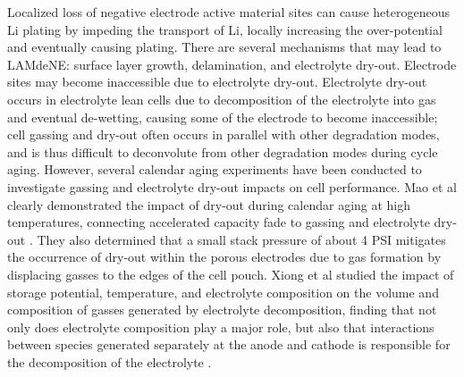 \documentclass{article}
\begin{document}
Localized loss of negative electrode active material sites can cause heterogeneous Li plating by impeding the transport of Li, locally increasing the over-potential and eventually causing plating. There are several mechanisms that may lead to LAMdeNE: surface layer growth, delamination, and electrolyte dry-out. 
Electrode sites may become inaccessible due to electrolyte dry-out. Electrolyte dry-out occurs in electrolyte lean cells due to decomposition of the electrolyte into gas and eventual de-wetting, causing some of the electrode to become inaccessible; cell gassing and dry-out often occurs in parallel with other degradation modes, and is thus difficult to deconvolute from other degradation modes during cycle aging. However, several calendar aging experiments have been conducted to investigate gassing and electrolyte dry-out impacts on cell performance. Mao et al clearly demonstrated the impact of dry-out during calendar aging at high temperatures, connecting accelerated capacity fade to gassing and electrolyte dry-out \cite{mao_calendar_2017}. They also determined that a small stack pressure of about 4 PSI mitigates the occurrence of dry-out within the porous electrodes due to gas formation by displacing gasses to the edges of the cell pouch. Xiong et al studied the impact of storage potential, temperature, and electrolyte composition on the volume and composition of gasses generated by electrolyte decomposition, finding that not only does electrolyte composition play a major role, but also that interactions between species generated separately at the anode and cathode is responsible for the decomposition of the electrolyte \cite{xiong_studies_2017}.
\end{document}
